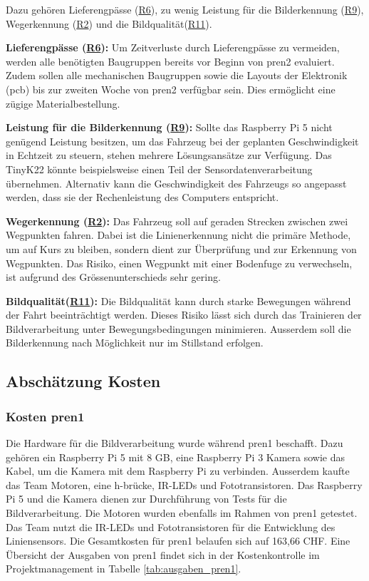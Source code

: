 \documentclass[../main.tex]{subfiles}
\begin{document}
Dazu gehören Lieferengpässe (\hyperlink{R6}{R6}), zu wenig Leistung für die Bilderkennung (\hyperlink{R9}{R9}), Wegerkennung (\hyperlink{R2}{R2}) und die Bildqualität(\hyperlink{R11}{R11}). 

\textbf{Lieferengpässe (\hyperlink{R6}{R6}):} Um Zeitverluste durch Lieferengpässe zu vermeiden, werden alle benötigten Baugruppen bereits vor Beginn von \acrshort{pren2} evaluiert. Zudem sollen alle mechanischen Baugruppen sowie die Layouts der Elektronik (\acrshort{pcb}) bis zur zweiten Woche von \acrshort{pren2} verfügbar sein. Dies ermöglicht eine zügige Materialbestellung.

\textbf{Leistung für die Bilderkennung (\hyperlink{R9}{R9}):} Sollte das Raspberry Pi 5 nicht genügend Leistung besitzen, um das Fahrzeug bei der geplanten Geschwindigkeit in Echtzeit zu steuern, stehen mehrere Lösungsansätze zur Verfügung. Das TinyK22 könnte beispielsweise einen Teil der Sensordatenverarbeitung übernehmen. Alternativ kann die Geschwindigkeit des Fahrzeugs so angepasst werden, dass sie der Rechenleistung des Computers entspricht.

\textbf{Wegerkennung (\hyperlink{R2}{R2}):} Das Fahrzeug soll auf geraden Strecken zwischen zwei Wegpunkten fahren. Dabei ist die Linienerkennung nicht die primäre Methode, um auf Kurs zu bleiben, sondern dient zur Überprüfung und zur Erkennung von Wegpunkten. Das Risiko, einen Wegpunkt mit einer Bodenfuge zu verwechseln, ist aufgrund des Grössenunterschieds sehr gering.

\textbf{Bildqualität(\hyperlink{R11}{R11}):} Die Bildqualität kann durch starke Bewegungen während der Fahrt beeinträchtigt werden. Dieses Risiko lässt sich durch das Trainieren der Bildverarbeitung unter Bewegungsbedingungen minimieren. Ausserdem soll die Bilderkennung nach Möglichkeit nur im Stillstand erfolgen.

\subsection{Abschätzung Kosten}

\subsubsection{Kosten \acrshort{pren1}}
Die Hardware für die Bildverarbeitung wurde während \acrshort{pren1} beschafft. Dazu gehören ein Raspberry Pi 5 mit 8 GB, eine Raspberry Pi 3 Kamera sowie das Kabel, um die Kamera mit dem Raspberry Pi zu verbinden. Ausserdem kaufte das Team Motoren, eine \gls{h-brücke}, IR-LEDs und Fototransistoren. Das Raspberry Pi 5 und die Kamera dienen zur Durchführung von Tests für die Bildverarbeitung. Die Motoren wurden ebenfalls im Rahmen von \acrshort{pren1} getestet. Das Team nutzt die IR-LEDs und Fototransistoren für die Entwicklung des Liniensensors. Die Gesamtkosten für \acrshort{pren1} belaufen sich auf 163,66 CHF. Eine Übersicht der Ausgaben von \acrshort{pren1} findet sich in der Kostenkontrolle im Projektmanagement in Tabelle \ref{tab:ausgaben_pren1}.
\end{document}
